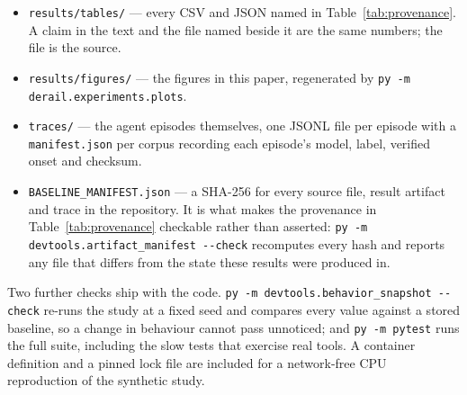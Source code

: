 \documentclass{article}
\begin{document}
\begin{itemize}
\item \texttt{results/tables/} --- every CSV and JSON named in Table~\ref{tab:provenance}. A claim in the text and the file named beside it are the same numbers; the file is the source.
\item \texttt{results/figures/} --- the figures in this paper, regenerated by \texttt{py -m derail.experiments.plots}.
\item \texttt{traces/} --- the agent episodes themselves, one JSONL file per episode with a \texttt{manifest.json} per corpus recording each episode's model, label, verified onset and checksum.
\item \texttt{BASELINE\_MANIFEST.json} --- a SHA-256 for every source file, result artifact and trace in the repository. It is what makes the provenance in Table~\ref{tab:provenance} checkable rather than asserted: \texttt{py -m devtools.artifact\_manifest -{}-check} recomputes every hash and reports any file that differs from the state these results were produced in.
\end{itemize}

Two further checks ship with the code. \texttt{py -m devtools.behavior\_snapshot -{}-check} re-runs the study at a fixed seed and compares every value against a stored baseline, so a change in behaviour cannot pass unnoticed; and \texttt{py -m pytest} runs the full suite, including the slow tests that exercise real tools. A container definition and a pinned lock file are included for a network-free CPU reproduction of the synthetic study.
\end{document}
